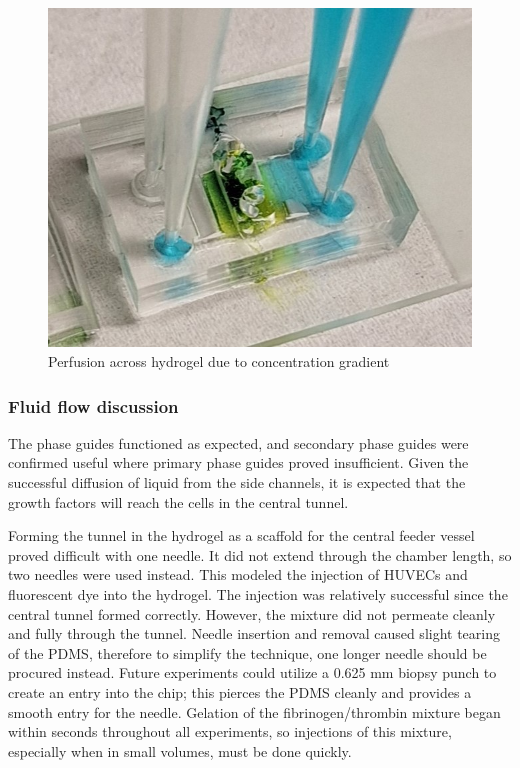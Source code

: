 \documentclass[letterpaper,12pt]{article}
\begin{document}
\begin{figure}[h!]
    \begin{minipage}[b]{0.3\linewidth}
        \centering
        \includegraphics[width=\linewidth]{dapp_report/figures/Fig Z 5;4.jpg}
        \caption{Perfusion across hydrogel due to concentration gradient}
        \label{fig:Z}
    \end{minipage}
\end{figure}

\subsubsection{Fluid flow discussion}

The phase guides functioned as expected, and secondary phase guides were confirmed useful where primary phase guides proved insufficient. Given the successful diffusion of liquid from the side channels, it is expected that the growth factors will reach the cells in the central tunnel. 

Forming the tunnel in the hydrogel as a scaffold for the central feeder vessel proved difficult with one needle. It did not extend through the chamber length, so two needles were used instead. This modeled the injection of HUVECs and fluorescent dye into the hydrogel. The injection was relatively successful since the central tunnel formed correctly. However, the mixture did not permeate cleanly and fully through the tunnel. Needle insertion and removal caused slight tearing of the PDMS, therefore to simplify the technique, one longer needle should be procured instead. Future experiments could utilize a 0.625 mm biopsy punch to create an entry into the chip; this pierces the PDMS cleanly and provides a smooth entry for the needle. Gelation of the fibrinogen/thrombin mixture began within seconds throughout all experiments, so injections of this mixture, especially when in small volumes, must be done quickly. 
\end{document}

